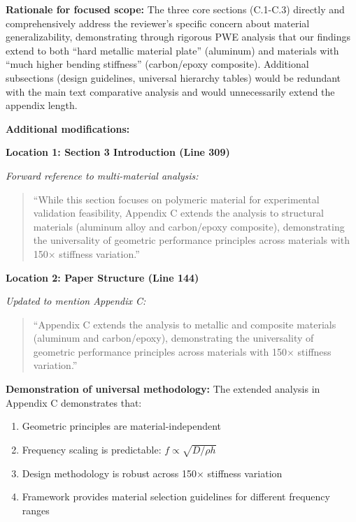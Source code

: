 \documentclass[11pt,a4paper]{article}
\newenvironment{changesbox}{%
    \par\medskip\noindent{\color{changescolor}\rule{\linewidth}{2pt}}\par
    \noindent{\color{changescolor}\bfseries Manuscript Changes}\par\smallskip
}{%
    \par\noindent{\color{changescolor}\rule{\linewidth}{0.5pt}}\medskip
}
\begin{document}
\begin{changesbox}
\textbf{Rationale for focused scope:} The three core sections (C.1-C.3) directly and comprehensively address the reviewer's specific concern about material generalizability, demonstrating through rigorous PWE analysis that our findings extend to both ``hard metallic material plate'' (aluminum) and materials with ``much higher bending stiffness'' (carbon/epoxy composite). Additional subsections (design guidelines, universal hierarchy tables) would be redundant with the main text comparative analysis and would unnecessarily extend the appendix length.

\textbf{Additional modifications:}

\textbf{Location 1: Section 3 Introduction (Line 309)}

\textit{Forward reference to multi-material analysis:}
\begin{quote}
\textcolor{redtext}{``While this section focuses on polymeric material for experimental validation feasibility, Appendix C extends the analysis to structural materials (aluminum alloy and carbon/epoxy composite), demonstrating the universality of geometric performance principles across materials with 150$\times$ stiffness variation.''}
\end{quote}

\textbf{Location 2: Paper Structure (Line 144)}

\textit{Updated to mention Appendix C:}
\begin{quote}
\textcolor{redtext}{``Appendix C extends the analysis to metallic and composite materials (aluminum and carbon/epoxy), demonstrating the universality of geometric performance principles across materials with 150$\times$ stiffness variation.''}
\end{quote}
\end{changesbox}

\textbf{Demonstration of universal methodology:} The extended analysis in Appendix C demonstrates that:
\begin{enumerate}
    \item Geometric principles are material-independent
    \item Frequency scaling is predictable: $f \propto \sqrt{D/\rho h}$
    \item Design methodology is robust across 150$\times$ stiffness variation
    \item Framework provides material selection guidelines for different frequency ranges
\end{enumerate}
\end{document}

